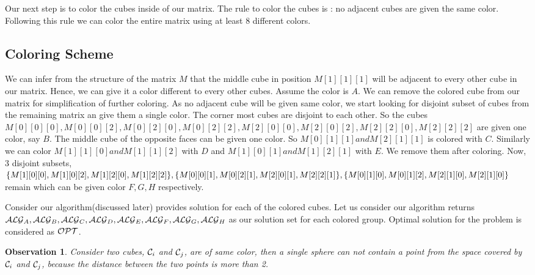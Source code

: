 \documentclass[a4paper,10pt]{article}  %
\newtheorem{observation}{Observation}
\begin{document}
	Our next step is to color the cubes inside of our matrix. The rule to color the cubes is : no adjacent cubes are given the same color. Following this rule we can color the entire matrix using at least $8$ different colors. 
	
	\subsection{Coloring Scheme}
	
	We can infer from the structure of the matrix $M$ that the middle cube in position $M[1][1][1]$ will be adjacent to every other cube in our matrix. Hence, we can give it a color different to every other cubes. Assume the color is $A$. We can remove the colored cube from our matrix for simplification of further coloring. As no adjacent cube will be given same color, we start looking for disjoint subset of cubes from the remaining matrix an give them a single color. The corner most cubes are disjoint to each other. So the cubes $M[0][0][0], M[0][0][2], M[0][2][0], M[0][2][2], M[2][0][0], M[2][0][2], M[2][2][0], M[2][2][2]$ are given one color, say $B$. The middle cube of the opposite faces can be given one color. So $M[0][1][1] and M[2][1][1]$ is colored with $C$. Similarly we can color $M[1][1][0] and M[1][1][2]$ with $D$ and $M[1][0][1] and M[1][2][1]$ with $E$. We remove them after coloring. Now, 3 disjoint subsets, $\{M[1][0][0], M[1][0][2], M[1][2][0], M[1][2][2]\} , \{ M[0][0][1], M[0][2][1], M[2][0][1],\\ M[2][2][1] \}, \{ M[0][1][0], M[0][1][2], M[2][1][0], M[2][1][0] \}$  remain which can be given color $ F, G, H$ respectively.
	
	Consider our algorithm(discussed later) provides solution for each of the colored cubes. Let us consider our algorithm returns
	${\cal ALG}_A, {\cal ALG}_B, {\cal ALG}_C, {\cal ALG}_D, {\cal ALG}_E, {\cal ALG}_F, {\cal ALG}_G,\\ {\cal ALG}_H$ as our solution set for each colored group. Optimal solution for the problem is considered as ${\cal OPT}$.\
	
	
	\theoremstyle{observation}
	\begin{observation}{}
		Consider two cubes, ${\cal C}_i$ and ${\cal C}_j$, are of same color, then a single sphere can not contain a point from the space covered by ${\cal C}_i$ and ${\cal C}_j$, because the distance between the two points is more than 2.
	\end{observation}
	
		
\end{document}
